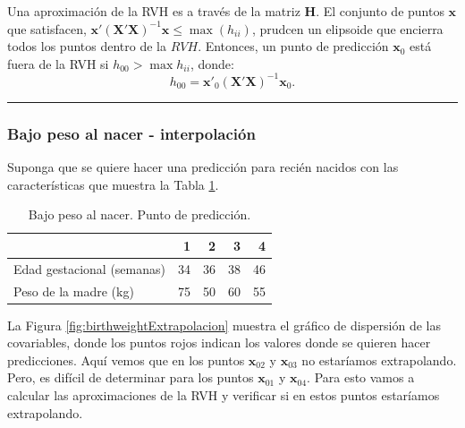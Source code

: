 \documentclass[
]{article}
\begin{document}
Una aproximación de la RVH es a través de la matriz \(\boldsymbol H\). El conjunto de puntos \(\boldsymbol x\) que satisfacen, \(\boldsymbol x'(\boldsymbol X'\boldsymbol X)^{-1}\boldsymbol x\leq \max(h_{ii})\), prudcen un elipsoide que encierra todos los puntos dentro de la \(RVH\). Entonces, un punto de predicción \(\boldsymbol x_{0}\) está fuera de la RVH si \(h_{00} > \max{h_{ii}}\), donde:
\[
h_{00} = \boldsymbol x'_{0}(\boldsymbol X'\boldsymbol X)^{-1}\boldsymbol x_{0}.
\]

\rule{\textwidth}{0.4pt}

\hypertarget{bajo-peso-al-nacer---interpolaciuxf3n}{%
\subsubsection*{Bajo peso al nacer - interpolación}\label{bajo-peso-al-nacer---interpolaciuxf3n}}

Suponga que se quiere hacer una predicción para recién nacidos con las características que muestra la Tabla \ref{tab:puntosPrediccion}.

\begin{table}

\caption{\label{tab:puntosPrediccion}Bajo peso al nacer. Punto de predicción.}
\centering
\begin{tabular}[t]{lrrrr}
\toprule
  & 1 & 2 & 3 & 4\\
\midrule
Edad gestacional (semanas) & 34 & 36 & 38 & 46\\
Peso de la madre (kg) & 75 & 50 & 60 & 55\\
\bottomrule
\end{tabular}
\end{table}

La Figura \ref{fig:birthweightExtrapolacion} muestra el gráfico de dispersión de las covariables, donde los puntos rojos indican los valores donde se quieren hacer predicciones. Aquí vemos que en los puntos \(\boldsymbol x_{02}\) y \(\boldsymbol x_{03}\) no estaríamos extrapolando. Pero, es difícil de determinar para los puntos \(\boldsymbol x_{01}\) y \(\boldsymbol x_{04}\). Para esto vamos a calcular las aproximaciones de la RVH y verificar si en estos puntos estaríamos extrapolando.
\end{document}
